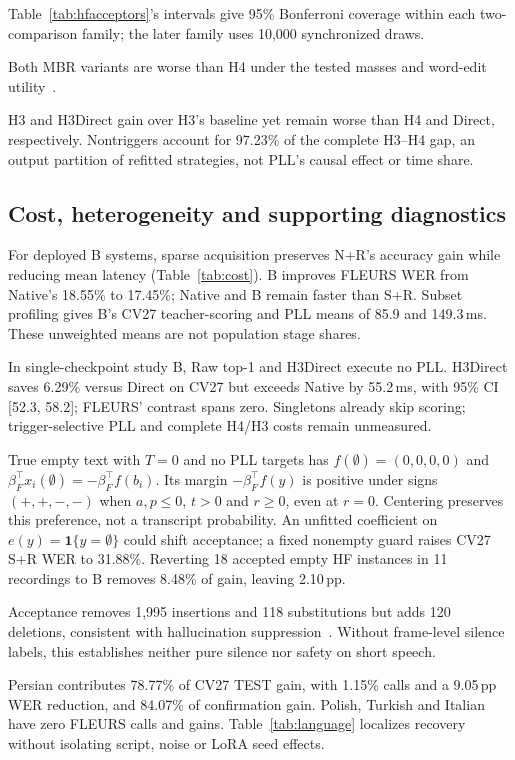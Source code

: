 Table~\ref{tab:hfacceptors}'s intervals give 95\% Bonferroni coverage within each two-comparison family; the later family uses 10,000 synchronized draws.

Both MBR variants are worse than H4 under the tested masses and word-edit utility~\cite{jinnai2025mbrasr}.

H3 and H3Direct gain over H3's baseline yet remain worse than H4 and Direct, respectively. Nontriggers account for 97.23\% of the complete H3--H4 gap, an output partition of refitted strategies, not PLL's causal effect or time share.

\subsection{Cost, heterogeneity and supporting diagnostics}

For deployed B systems, sparse acquisition preserves N+R's accuracy gain while reducing mean latency (Table~\ref{tab:cost}). B improves FLEURS WER from Native's 18.55\% to 17.45\%; Native and B remain faster than S+R. Subset profiling gives B's CV27 teacher-scoring and PLL means of 85.9 and 149.3\,ms. These unweighted means are not population stage shares.

In single-checkpoint study B, Raw top-1 and H3Direct execute no PLL. H3Direct saves 6.29\% versus Direct on CV27 but exceeds Native by 55.2\,ms, with 95\% CI [52.3, 58.2]; FLEURS' contrast spans zero. Singletons already skip scoring; trigger-selective PLL and complete H4/H3 costs remain unmeasured.


True empty text with $T=0$ and no PLL targets has $f(\emptyset)=(0,0,0,0)$ and $\beta_F^\top x_i(\emptyset)=-\beta_F^\top f(b_i)$. Its margin $-\beta_F^\top f(y)$ is positive under signs $(+,+,-,-)$ when $a,p\le0$, $t>0$ and $r\ge0$, even at $r=0$. Centering preserves this preference, not a transcript probability. An unfitted coefficient on $e(y)=\mathbf1\{y=\emptyset\}$ could shift acceptance; a fixed nonempty guard raises CV27 S+R WER to 31.88\%. Reverting 18 accepted empty HF instances in 11 recordings to B removes 8.48\% of gain, leaving 2.10\,pp.

Acceptance removes 1,995 insertions and 118 substitutions but adds 120 deletions, consistent with hallucination suppression~\cite{baranski2025nonspeech}. Without frame-level silence labels, this establishes neither pure silence nor safety on short speech.

\pagebreak[4]
Persian contributes 78.77\% of CV27 TEST gain, with 1.15\% calls and a 9.05\,pp WER reduction, and 84.07\% of confirmation gain. Polish, Turkish and Italian have zero FLEURS calls and gains. Table~\ref{tab:language} localizes recovery without isolating script, noise or LoRA seed effects.

